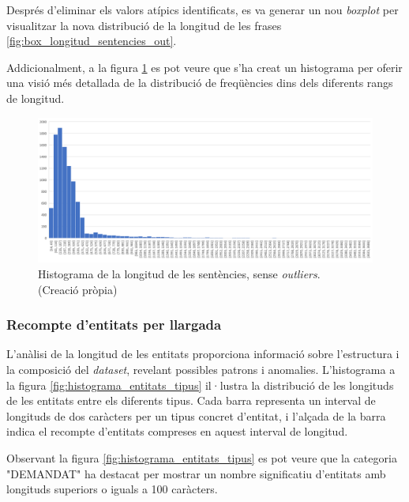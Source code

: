 Després d'eliminar els valors atípics identificats, es va generar un nou \textit{boxplot} per visualitzar la nova distribució de la longitud de les frases \ref{fig:box_longitud_sentencies_out}. 

Addicionalment, a la figura \ref{fig:histograma_sentencies_out} es pot veure que s'ha creat un histograma per oferir una visió més detallada de la distribució de freqüències dins dels diferents rangs de longitud.

\begin{figure}[H]
  \centering
  \includegraphics[width=\textwidth]{hist_sent_out.png}
  \caption[Histograma de la longitud de les sentències]{Histograma de la longitud de les sentències, sense \textit{outliers}. \\ (Creació pròpia)}
  \label{fig:histograma_sentencies_out}
\end{figure}


\subsubsection{Recompte d'entitats per llargada}
L'anàlisi de la longitud de les entitats proporciona informació sobre l'estructura i la composició del \textit{dataset}, revelant possibles patrons i anomalies. L'histograma a la figura \ref{fig:histograma_entitats_tipus} il·lustra la distribució de les longituds de les entitats entre els diferents tipus. Cada barra representa un interval de longituds de dos caràcters per un tipus concret d'entitat, i l'alçada de la barra indica el recompte d'entitats compreses en aquest interval de longitud.

Observant la figura \ref{fig:histograma_entitats_tipus} es pot veure que la categoria "DEMANDAT" ha destacat per mostrar un nombre significatiu d'entitats amb longituds superiors o iguals a 100 caràcters.

